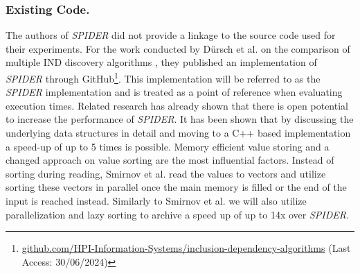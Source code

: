 \subsubsection{\textbf{Existing Code.}}
The authors of \textit{SPIDER} did not provide a linkage to the source code used for their experiments. For the work conducted by Dürsch et al. on the comparison of multiple IND discovery algorithms \cite{dursch2019inclusion}, they published an implementation of \textit{SPIDER} through GitHub\footnote{\href{https://github.com/HPI-Information-Systems/inclusion-dependency-algorithms}{github.com/HPI-Information-Systems/inclusion-dependency-algorithms} (Last Access: 30/06/2024)}. This implementation will be referred to as the \textit{SPIDER} implementation and is treated as a point of reference when evaluating execution times. Related research has already shown that there is open potential to increase the performance of \textit{SPIDER}. It has been shown that by discussing the underlying data structures in detail and moving to a C++ based implementation \cite{smirnov2023fast} a speed-up of up to 5 times is possible. Memory efficient value storing and a changed approach on value sorting are the most influential factors. Instead of sorting during reading, Smirnov et al. read the values to vectors and utilize sorting these vectors in parallel once the main memory is filled or the end of the input is reached instead. Similarly to Smirnov et al. we will also utilize parallelization and lazy sorting to archive a speed up of up to 14x over \textit{SPIDER}.

